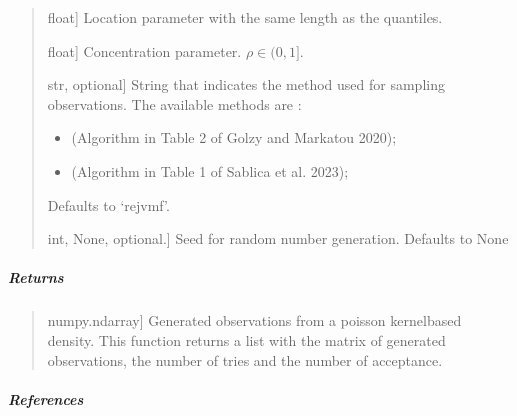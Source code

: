\documentclass[letterpaper,10pt,english,openany,oneside]{sphinxmanual}
\begin{document}
{{{{\begin{fulllineitems}
\begin{quote}
\begin{description}
\sphinxlineitem{mu}{[}float{]}
\sphinxAtStartPar
Location parameter with the same length as the quantiles.

\sphinxlineitem{rho}{[}float{]}
\sphinxAtStartPar
Concentration parameter. \(\rho \in (0,1]\).

\sphinxlineitem{method}{[}str, optional{]}
\sphinxAtStartPar
String that indicates the method used for sampling observations.
The available methods are :
\begin{itemize}
\item {} \begin{description}
\sphinxAtStartPar
(Algorithm in Table 2 of Golzy and Markatou 2020);

\end{description}

\item {} \begin{description}
\sphinxAtStartPar
(Algorithm in Table 1 of Sablica et al. 2023);

\end{description}

\end{itemize}

\sphinxAtStartPar
Defaults to ‘rejvmf’.

\sphinxlineitem{random\_state}{[}int, None, optional.{]}
\sphinxAtStartPar
Seed for random number generation. Defaults to None

\end{description}
\end{quote}


\subparagraph{Returns}
\label{\detokenize{api_reference/generated/QuadratiK.spherical_clustering.PKBD:id2}}\begin{quote}
\begin{description}
\sphinxlineitem{samples}{[}numpy.ndarray{]}
\sphinxAtStartPar
Generated observations from a poisson kernel\sphinxhyphen{}based density.
This function returns a list with the matrix of generated observations, the
number of tries and the number of acceptance.

\end{description}
\end{quote}


\subparagraph{References}
\label{\detokenize{api_reference/generated/QuadratiK.spherical_clustering.PKBD:references}}\begin{quote}


\end{quote}
\end{fulllineitems}}}}}
\end{document}
